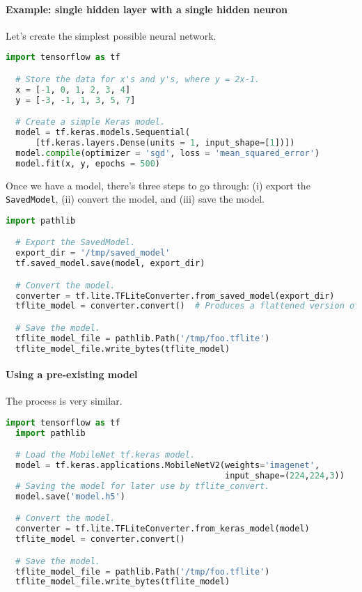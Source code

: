 \documentclass[12pt]{article}
\begin{document}
\paragraph{Example: single hidden layer with a single hidden neuron} Let's create the simplest possible neural network.
\begin{lstlisting}[language=Python]
  import tensorflow as tf

  # Store the data for x's and y's, where y = 2x-1.
  x = [-1, 0, 1, 2, 3, 4]
  y = [-3, -1, 1, 3, 5, 7]

  # Create a simple Keras model.
  model = tf.keras.models.Sequential(
      [tf.keras.layers.Dense(units = 1, input_shape=[1])])
  model.compile(optimizer = 'sgd', loss = 'mean_squared_error')
  model.fit(x, y, epochs = 500)
\end{lstlisting}
Once we have a model, there's three steps to go through: (i) export the \texttt{SavedModel}, (ii) convert the model, and (iii) save the model.
\begin{lstlisting}[language=Python]
  import pathlib

  # Export the SavedModel.
  export_dir = '/tmp/saved_model'
  tf.saved_model.save(model, export_dir)

  # Convert the model.
  converter = tf.lite.TFLiteConverter.from_saved_model(export_dir)
  tflite_model = converter.convert()  # Produces a flattened version of the model.

  # Save the model.
  tflite_model_file = pathlib.Path('/tmp/foo.tflite')
  tflite_model_file.write_bytes(tflite_model)  
\end{lstlisting}

\paragraph{Using a pre-existing model}
The process is very similar.
\begin{lstlisting}[language=Python]
  import tensorflow as tf
  import pathlib

  # Load the MobileNet tf.keras model.
  model = tf.keras.applications.MobileNetV2(weights='imagenet',
                                            input_shape=(224,224,3))
  # Saving the model for later use by tflite_convert.
  model.save('model.h5')

  # Convert the model.
  converter = tf.lite.TFLiteConverter.from_keras_model(model)
  tflite_model = converter.convert()

  # Save the model.
  tflite_model_file = pathlib.Path('/tmp/foo.tflite')
  tflite_model_file.write_bytes(tflite_model)
\end{lstlisting}
\end{document}
